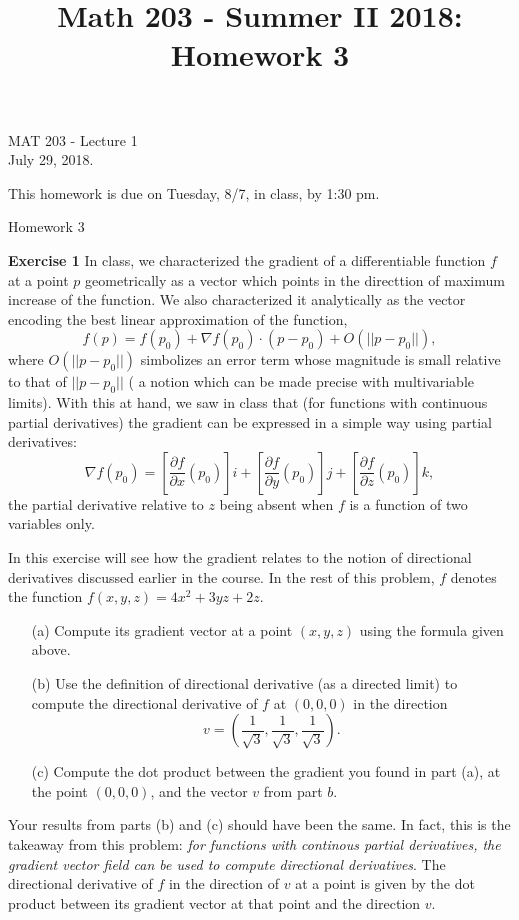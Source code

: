 \documentclass[12pt,oneside]{exam}
\title{Math 203 - Summer II 2018: Homework 3}
\newenvironment{exercise}[1]{\vspace{.1in}\noindent\textbf{Exercise #1 \hspace{.05em}}}{}
\begin{document}
\begin{flushright}
\sc MAT 203 - Lecture 1\\
July 29, 2018.
\end{flushright}
\bigskip

This homework is due on Tuesday, 8/7, in class, by 1:30 pm. 
\begin{center}
\textsf{Homework 3} 
\end{center}

\begin{exercise}{1}
In class, we characterized the gradient of a differentiable function $f$ at a point $p$ geometrically as a vector which points in the directtion of maximum increase of the function. We also characterized it analytically as the vector encoding the best linear approximation of the function, 
\begin{equation*}
f(p)=f(p_0)+\nabla f(p_0) \cdot (p-p_0) + O(||p-p_0||), 
\end{equation*}
where $O(||p-p_0||)$ simbolizes an error term whose magnitude is small relative to that of $||p-p_0||$ ( a notion which can be made precise with multivariable limits). With this at hand, we saw in class that (for functions with continuous partial derivatives) the gradient can be expressed in a simple way using partial derivatives:
\begin{equation}\label{gradient}
\nabla f(p_0) = \left[\frac{\partial f}{\partial x} (p_0)\right]i + \left[\frac{\partial f}{\partial y} (p_0)\right] j  + \left[\frac{\partial f}{\partial z} (p_0)\right] k,
\end{equation}
the partial derivative relative to $z$ being absent when $f$ is a function of two variables only. 

In this exercise will see how the gradient relates to the notion of directional derivatives discussed earlier in the course. In the rest of this problem, $f$ denotes the function $f(x,y,z)=4x^2+3yz+2z$. 

\begin{itemize}
\item[(a)] Compute its gradient vector at a point $(x,y,z)$ using the formula given above. 
\item[(b)] Use the definition of directional derivative (as a directed limit) to compute the directional derivative of $f$ at $(0,0,0)$ in the direction 
\begin{equation*}
v=\left(\frac{1}{\sqrt 3}, \frac{1}{\sqrt 3},\frac{1}{\sqrt 3}\right).
\end{equation*}
\item[(c)] Compute the dot product between the gradient you found in part (a), at the point $(0,0,0)$, and the vector $v$ from part $b$. 
\end{itemize}

Your results from parts (b) and (c) should have been the same. In fact, this is the takeaway from this problem: \textit{for functions with continous partial derivatives, the gradient vector field can be used to compute directional derivatives}. The directional derivative of $f$ in the direction of $v$ at a point is given by the dot product between its gradient vector at that point and the direction $v$. 
\end{exercise}
\end{document}
